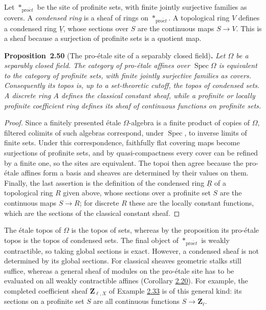 \documentclass[11pt]{article}
\newenvironment{bpstatement}[2]{\par\addvspace{0.6\baselineskip}\noindent\textbf{#1}#2\textbf{.}\enspace\ignorespaces}
  {\par\addvspace{0.4\baselineskip}}
\newenvironment{bpstatementit}[2]{\begin{bpstatement}{#1}{#2}\itshape\ignorespaces}{\end{bpstatement}}
\begin{document}
Let \(*_{\mathrm{pro}\acute{e}t}\) be the site of profinite sets, with finite jointly surjective families as covers. A \emph{condensed ring} is a sheaf of rings on \(*_{\mathrm{pro}\acute{e}t}\). A topological ring \(V\) defines a condensed ring \(\underline V\), whose sections over \(S\) are the continuous maps \(S\to V\). This is a sheaf because a surjection of profinite sets is a quotient map.

\label{bp151}%
\begin{bpstatementit}{Proposition~2.50}{ (The pro-étale site of a separably closed field)}
Let \(\Omega\) be a separably closed field. The category of pro-étale affines over \(\operatorname{Spec}\Omega\) is equivalent to the category of profinite sets, with finite jointly surjective families as covers. Consequently its topos is, up to a set-theoretic cutoff, the topos of condensed sets. A discrete ring \(A\) defines the classical constant sheaf, while a profinite or locally profinite coefficient ring defines its sheaf of continuous functions on profinite sets.
\end{bpstatementit}

\begin{proof}[{Proof}]\label{bp152}%
Since a finitely presented étale \(\Omega\)-algebra is a finite product of copies of \(\Omega\), filtered colimits of such algebras correspond, under \(\operatorname{Spec}\), to inverse limits of finite sets. Under this correspondence, faithfully flat covering maps become surjections of profinite sets, and by quasi-compactness every cover can be refined by a finite one, so the sites are equivalent. The topoi then agree because the pro-étale affines form a basis and sheaves are determined by their values on them. Finally, the last assertion is the definition of the condensed ring \(\underline R\) of a topological ring \(R\) given above, whose sections over a profinite set \(S\) are the continuous maps \(S\to R\); for discrete \(R\) these are the locally constant functions, which are the sections of the classical constant sheaf.
\end{proof}

\label{bp153}%
The étale topos of \(\Omega\) is the topos of sets, whereas by the proposition its pro-étale topos is the topos of condensed sets. The final object of \(*_{\mathrm{pro}\acute{e}t}\) is weakly contractible, so taking global sections is exact. However, a condensed sheaf is not determined by its global sections. For classical sheaves geometric stalks still suffice, whereas a general sheaf of modules on the pro-étale site has to be evaluated on all weakly contractible affines (Corollary \hyperref[bp57]{2.20}). For example, the completed coefficient sheaf \(\mathbf Z_{\ell,X}\) of Example \hyperref[bp95]{2.33} is of this general kind: its sections on a profinite set \(S\) are all continuous functions \(S\to\mathbf Z_\ell\).
\end{document}
